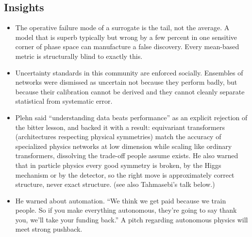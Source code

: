 \documentclass[11pt]{article}
\begin{document}
\subsection*{Insights}
\begin{itemize}
    \item The operative failure mode of a surrogate is the tail, not the average. A model that is superb typically but wrong by a few percent in one sensitive corner of phase space can manufacture a false discovery. Every mean-based metric is structurally blind to exactly this.
    \item Uncertainty standards in this community are enforced socially. Ensembles of networks were dismissed as uncertain not because they perform badly, but because their calibration cannot be derived and they cannot cleanly separate statistical from systematic error.
    \item Plehn said ``understanding data beats performance'' as an explicit rejection of the bitter lesson, and backed it with a result: equivariant transformers (architectures respecting physical symmetries) match the accuracy of specialized physics networks at low dimension while scaling like ordinary transformers, dissolving the trade-off people assume exists. He also warned that in particle physics every good symmetry is broken, by the Higgs mechanism or by the detector, so the right move is approximately correct structure, never exact structure. (see also Tahmasebi's talk below.)
    \item He warned about automation. ``We think we get paid because we train people. So if you make everything autonomous, they're going to say thank you, we'll take your funding back.'' A pitch regarding autonomous physics will meet strong pushback.
\end{itemize}
\end{document}
